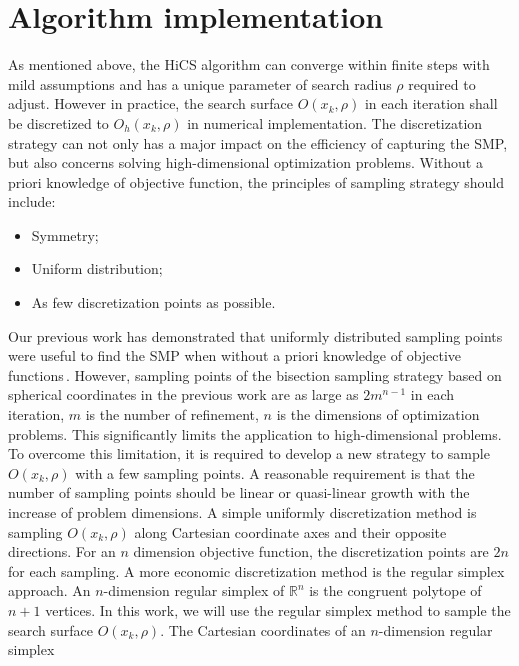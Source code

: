 \documentclass[final,1p,times]{elsarticle}
\begin{document}
\section{Algorithm implementation}
\label{sec:implement}

As mentioned above, the HiCS algorithm can converge within 
finite steps with mild assumptions and has a unique parameter of
search radius
$\rho$ required to adjust. However in practice, the search
surface $O(x_k,\rho)$ in each iteration shall be discretized to
$O_h(x_k, \rho)$ in numerical implementation. 
The discretization strategy can not
only has a major impact on the efficiency of capturing the SMP,
but also concerns solving high-dimensional optimization problems. 
Without a priori knowledge of objective function, 
the principles of sampling strategy should include:
\begin{itemize}
	\item Symmetry; 
	\item Uniform distribution; 
	\item As few discretization points as possible.
\end{itemize}
Our previous work has demonstrated that uniformly distributed
sampling points were useful to find the SMP when
without a priori knowledge of objective functions\,\cite{huang2017hill}. 
However, sampling points of the bisection sampling strategy based
on spherical coordinates in the
previous work are as large as $2m^{n-1}$ in each iteration, $m$
is the number of refinement, $n$ is the dimensions of
optimization problems. This significantly limits the
application to high-dimensional problems. 
To overcome this limitation, it is required to develop a new
strategy to sample $O(x_k,\rho)$ with a few sampling points.
A reasonable requirement is that the number of sampling points
should be linear or quasi-linear growth with the increase of
problem dimensions.
A simple uniformly discretization method is sampling $O(x_k,
\rho)$ along Cartesian coordinate axes and their opposite
directions.
For an $n$ dimension objective function, 
the discretization points are $2n$ for each sampling. 
A more economic discretization method
is the regular simplex approach. 
An $n$-dimension regular simplex of $\mathbb{R}^n$ is the
congruent polytope of $n+1$ vertices. 
In this work, we will use the regular simplex method to sample 
the search surface $O(x_k,\rho)$. The Cartesian
coordinates of an $n$-dimension regular simplex 
\end{document}
